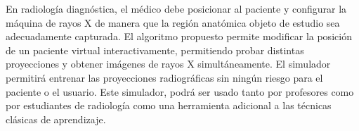 \begin{itemize}
\begin{itemize}
En radiología diagnóstica, el médico debe posicionar al paciente y configurar la máquina de rayos X de manera que la región anatómica objeto de estudio sea adecuadamente capturada. El algoritmo propuesto permite modificar la posición de un paciente virtual interactivamente, permitiendo probar distintas proyecciones y obtener imágenes de rayos X simultáneamente. El simulador permitirá entrenar las proyecciones radiográficas sin ningún riesgo para el paciente o el usuario. Este simulador, podrá ser usado tanto por profesores como por estudiantes de radiología como una herramienta adicional a las técnicas clásicas de aprendizaje.
\end{itemize}

\end{itemize}





